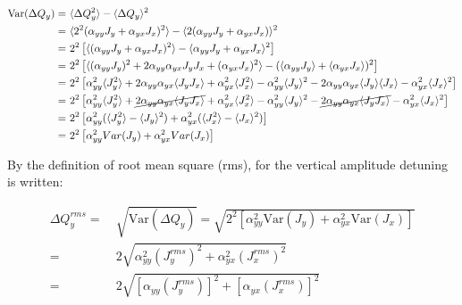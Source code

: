 \begin{equation}\label{eq:var_amplDetuning}
    \begin{split}
        \mathrm{Var}(\Delta Q_y) = &~\langle \Delta Q_y ^2 \rangle - \langle \Delta Q_y \rangle ^2 \\
        = &~\langle 2^2 (\alpha_{yy} J_y + \alpha_{yx}J_x)^2 \rangle - \langle 2(\alpha_{yy}J_y + \alpha_{yx}J_x) \rangle^2 \\
        = &~2^2 \left [ \langle (\alpha_{yy} J_y + \alpha_{yx}J_x)^2 \rangle - \langle \alpha_{yy}J_y + \alpha_{yx}J_x \rangle^2 \right ] \\
         = &~2^2 \left [  \langle (\alpha_{yy} J_y)^2 + 2\alpha_{yy}\alpha_{yx}J_yJ_x + (\alpha_{yx} J_x)^2  \rangle - (\langle \alpha_{yy}J_y \rangle + \langle \alpha_{yx}J_x \rangle )^2 \right ]\\
         =&~2^2\left [ \alpha_{yy}^2 \langle J_y^2 \rangle + 2\alpha_{yy}\alpha_{yx} \langle J_yJ_x \rangle + \alpha_{yx}^2 \langle J_x^2 \rangle -\alpha_{yy}^2  \langle J_y \rangle^2 - 2\alpha_{yy} \alpha_{yx} \langle J_y \rangle \langle J_x \rangle - \alpha_{yx} ^2 \langle J_x \rangle^2 \right ]\\
         =&~2^2\left [ \alpha_{yy}^2 \langle J_y^2 \rangle + \cancel{2\alpha_{yy}\alpha_{yx} \langle J_yJ_x \rangle} + \alpha_{yx}^2 \langle J_x^2 \rangle -\alpha_{yy}^2  \langle J_y \rangle^2 - \cancel{2\alpha_{yy} \alpha_{yx} \langle J_y J_x \rangle} - \alpha_{yx} ^2 \langle J_x \rangle^2 \right ]\\
         =&~2^2\left [ \alpha_{yy}^2(\langle J_y^2\rangle - \langle J_y \rangle^2 ) + \alpha_{yx}^2(\langle J_x^2\rangle - \langle J_x \rangle^2 ) \right ]\\
         =&~2^2\left [ \alpha_{yy}^2 Var(J_y) + \alpha_{yx}^2 Var(J_x) \right ]
    \end{split}
\end{equation}

By the definition of root mean square (rms), for the vertical amplitude detuning is written:

\begin{equation}\label{rms_amplitude_detuning}
    \begin{split}
    \Delta Q^{rms}_y = &~\sqrt{\mathrm{Var}(\Delta Q_y)}=\sqrt{2^2\left [ \alpha_{yy}^2 \mathrm{Var}(J_y) + \alpha_{yx}^2 \mathrm{Var}(J_x) \right ]}\\
    =&~2 \sqrt{\alpha_{yy}^2 (J^{rms}_y)^2 + \alpha_{yx}^2 (J^{rms}_x)^2 }\\
    =&~2 \sqrt{\left [\alpha_{yy} (J^{rms}_y)\right ]^2 + \left [ \alpha_{yx} (J^{rms}_x) \right ]^2 }
    \end{split}
\end{equation}

